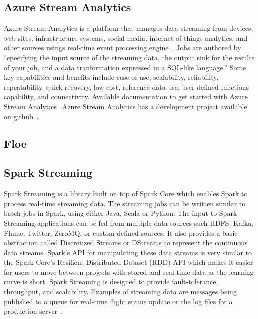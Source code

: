\subsection{Azure Stream Analytics}

Azure Stream Analytics is a platform that manages data streaming from
devices, web sites, infrastructure systems, social media, internet of
things analytics, and other sources usings real-time event processing
engine~\cite{www-azurestreamanalytics}. Jobs are authored by
``specifying the input source of the streaming data, the output sink
for the results of your job, and a data tranformation expressed in a
SQL-like language.''  Some key capabilities and benefits include ease
of use, scalability, reliability, repeatability, quick recovery, low
cost, reference data use, user defined functions capability, and
connectivity. Available documentation to get started with Azure Stream
Analytics~\cite{www-docs-microsoft}.Azure Stream Analytics has a
development project available on github~\cite{www-github-azure}.

     \pv

     
\subsection{Floe}

\pv 

\subsection{Spark Streaming}

Spark Streaming is a library built on top of Spark Core which enables
Spark to process real-time streaming data. The streaming jobs can be
written similar to batch jobs in Spark, using either Java, Scala or
Python. The input to Spark Streaming applications can be fed from
multiple data sources such HDFS, Kafka, Flume, Twitter, ZeroMQ, or
custom-defined sources. It also provides a basic abstraction called
Discretized Streams or DStreams to represent the continuous data
streams. Spark's API for manipulating these data streams is very
similar to the Spark Core's Resilient Distributed Dataset (RDD) API
which makes it easier for users to move between projects with stored
and real-time data as the learning curve is
short\cite{www-apache-spark-RDD}.  Spark Streaming is designed to
provide fault-tolerance, throughput, and scalability. Examples of
streaming data are messages being published to a queue for real-time
flight status update or the log files for a production
server~\cite{www-apache-spark-stream}.

